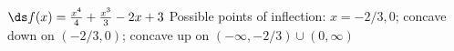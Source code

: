 {$\ds f(x) = \frac{x^4}{4}+\frac{x^3}{3}-2 x+3$
}
{Possible points of inflection: $x=-2/3,0$;
concave down on $(-2/3,0)$;
concave up on $(-\infty,-2/3)\cup(0,\infty)$
}
